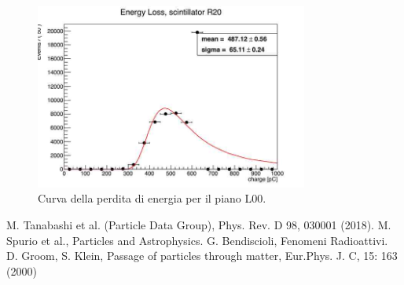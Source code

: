 \begin{figure}[H]
  \centering
  \includegraphics[width=0.8\textwidth]{plots/energy_R20.jpg}
  \caption{Curva della perdita di energia per il piano L00.}
  \label{fig:r20}
\end{figure}


\begin{thebibliography}{90}             %
\rhead[\fancyplain{}{\bfseries \leftmark}]{\fancyplain{}{\bfseries
\thepage}}
 M. Tanabashi et al. (Particle Data Group), Phys. Rev. D 98, 030001 (2018).
 M. Spurio et al., Particles and Astrophysics.
 G. Bendiscioli, Fenomeni Radioattivi.
 D. Groom, S. Klein, Passage of particles through matter, Eur.Phys. J. C, 15: 163 (2000)
\end{thebibliography}

